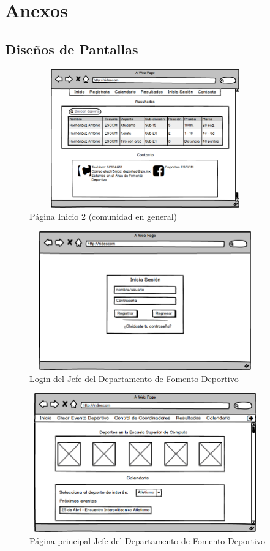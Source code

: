 \chapter{Anexos}
	\section{Diseños de Pantallas}
		
		
		\begin{figure}[hbt!]
			\centering
			\includegraphics[width=10cm, height=6cm]{Imagenes/Disenos/p20Iniciogeneral1.png}
			\caption{Página Inicio 2 (comunidad en general)}
			\label{Iniciogeneral1}
		\end{figure}
	
		\begin{figure}[hbt!]
			\centering
			\includegraphics[width=10cm, height=6cm]{Imagenes/Disenos/p2LoginJFD.png}
			\caption{Login del Jefe del Departamento de Fomento Deportivo}
			\label{LoginJFD}
		\end{figure}
	
		\begin{figure}[hbt!]
			\centering
			\includegraphics[width=10cm, height=6cm]{Imagenes/Disenos/p3InicioJefeFD.png}
			\caption{Página principal Jefe del Departamento de Fomento Deportivo}
			\label{IniciogeneralJFD}
		\end{figure}
			\pagebreak
	

